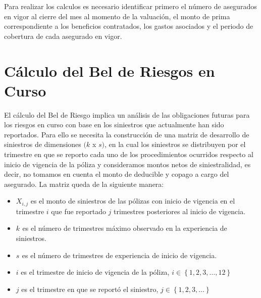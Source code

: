 \documentclass[11pt,twoside,openright,spanish]{report}
\numberwithin{equation}{chapter}
\numberwithin{figure}{chapter}
\numberwithin{table}{chapter}
\begin{document}
	Para realizar los calculos es necesario identificar primero el número de asegurados en vigor al cierre del mes al momento de la valuación, el monto de prima correspondiente a los beneficios contratados, los gastos asociados y el periodo de cobertura de cada asegurado en vigor.
		
	\section{Cálculo del Bel de Riesgos en Curso}

	El cálculo del Bel de Riesgo implica un análisis de las obligaciones futuras para los riesgos en curso con base en los siniestros que actualmente han sido reportados. Para ello se necesita la construcción de una matriz de desarrollo de siniestros  de dimensiones $(k$ x $s)$, en la cual los siniestros se distribuyen por el trimestre en que se reporto cada uno de los procedimientos ocurridos respecto al inicio de vigencia de la póliza y consideramos montos netos de siniestralidad, es decir, no tomamos en cuenta el monto de deducible y copago a cargo del asegurado. La matriz queda de la siguiente manera:

	\vspace{1cm}
	
	\begin{itemize}
		\item ${X}_{i,j}$ es el monto de siniestros de las pólizas con inicio de vigencia en el trimestre $i$ que fue reportado $j$ trimestres posteriores al inicio de vigencia.
		\item ${k}_{}$ es el número de trimestres máximo observado en la experiencia de siniestros.
		\item ${s}_{}$ es el número de trimestres de experiencia de inicio de vigencia.
		\item $i$ es el trimestre de inicio de vigencia de la póliza, $i\in \left\{1,2,3,\dots ,12\right\}$
		\item $j$ es el trimestre en que se reportó el siniestro,  $j\in \left\{1,2,3,\dots\right\}$
	\end{itemize}
	
	\vspace{1cm}
\end{document}
